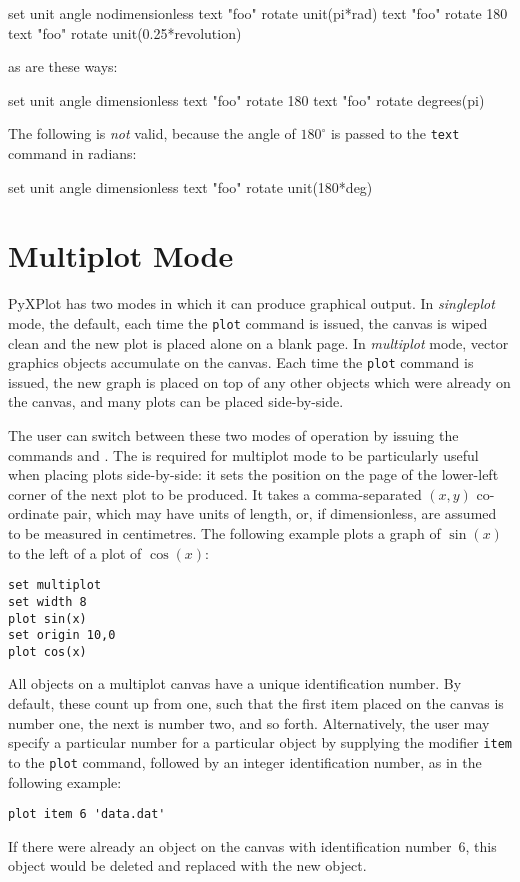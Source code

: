 \begin{dodo}
set unit angle nodimensionless
text "foo" rotate unit(pi*rad)
text "foo" rotate 180
text "foo" rotate unit(0.25*revolution)
\end{dodo}

\noindent as are these ways:

\begin{dodo}
set unit angle dimensionless
text "foo" rotate 180
text "foo" rotate degrees(pi)
\end{dodo}

\noindent The following is {\it not} valid, because the angle of $180^\circ$ is
passed to the {\tt text} command in radians:

\begin{dontdo}
set unit angle dimensionless
text "foo" rotate unit(180*deg)
\end{dontdo}

\section{Multiplot Mode}
\label{sec:multiplot}

PyXPlot has two modes in which it can produce graphical output. In {\it
singleplot} mode, the default, each time the {\tt plot} command is issued, the
canvas is wiped clean and the new plot is placed alone on a blank page. In {\it
multiplot} mode, vector graphics objects accumulate on the canvas. Each time
the {\tt plot} command is issued, the new graph is placed on top of any other
objects which were already on the canvas, and many plots can be placed
side-by-side.

The user can switch between these two modes of operation by issuing the
commands  and . The
 is required for multiplot mode to be particularly useful
when placing plots side-by-side: it sets the position on the page of the
lower-left corner of the next plot to be produced. It takes a comma-separated
$(x,y)$ co-ordinate pair, which may have units of length, or, if dimensionless,
are assumed to be measured in centimetres. The following example plots a graph
of $\sin(x)$ to the left of a plot of $\cos(x)$:
\begin{verbatim}
set multiplot
set width 8
plot sin(x)
set origin 10,0
plot cos(x)
\end{verbatim}

All objects on a multiplot canvas have a unique identification number.  By
default, these count up from one, such that the first item placed on the canvas
is number one, the next is number two, and so forth. Alternatively, the user
may specify a particular number for a particular object by supplying the
modifier {\tt item} to the {\tt plot} command, followed by an integer
identification number, as in the following example:
\begin{verbatim}
plot item 6 'data.dat'
\end{verbatim}
If there were already an object on the canvas with identification number~6,
this object would be deleted and replaced with the new object.

